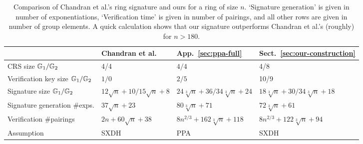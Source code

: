 
\begin{table}[h]
\begin{center}
\begin{minipage}{\textwidth}
\begin{center}
\begin{scriptsize}
\begin{tabular}{l|l|l|l}
                                           & Chandran et al.~\cite{ICALP:ChaGroSah07} & App.~\ref{sec:ppa-full} &  Sect.~\ref{sec:our-construction} \\
\hline%
\rule{0pt}{2.5ex}CRS size  $\mathbb{G}_1/\mathbb{G}_2$              & 4/4                                      & $4/4$  & 4/8    \\
\rule{0pt}{2.5ex}Verification key size $\mathbb{G}_1/\mathbb{G}_2$    & $1/0$                                       & $2/5$  &   10/9  \\
\rule{0pt}{2.5ex}Signature size      $\mathbb{G}_1/\mathbb{G}_2$      & $12\sqrt{n}+10/15\sqrt{n}+8$                        & $24\sqrt[3]{n} + 36/34\sqrt[3]{n} + 24$& $18\sqrt[3]{n} + 30/34\sqrt[3]{n} + 18$\\
\rule{0pt}{2.5ex}Signature generation \#exps. & $37\sqrt{n}+23$                        & $80\sqrt[3]{n}+71$&$72\sqrt[3]{n}+61$\\
\rule{0pt}{2.5ex}Verification \#pairings         & $2n + 60\sqrt{n}+38$                & $8n^{2/3} + 162\sqrt[3]{n} + 118$&$8n^{2/3} + 122\sqrt[3]{n} + 94$\\
\rule{0pt}{2.5ex}Assumption         & SXDH                & PPA & SXDH\\
\end{tabular}
\end{scriptsize}
\end{center}
\caption{Comparison of Chandran et al.'s ring signature and ours for a ring of size $n$. `Signature generation' is given in number of exponentiations, `Verification time' is given in number of pairings, and all other rows are given in number of group elements. A quick calculation shows that our signature outperforms Chandran et al.'s (roughly) for $n>180$.\label{table:eff}}
\end{minipage}
\end{center}
\end{table}
